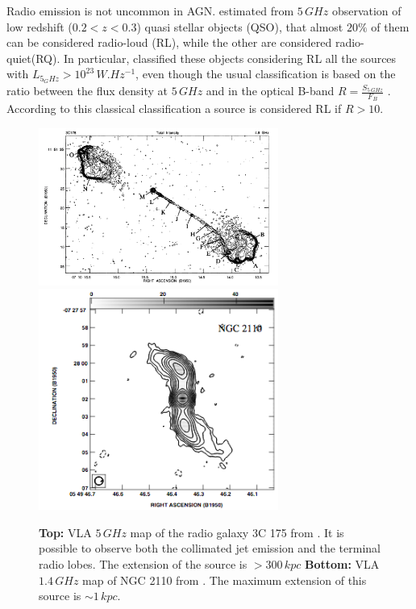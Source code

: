 \documentclass[../main.tex]{subfiles}
\begin{document}
Radio emission is not uncommon in AGN.
\citet{Kellermann16} estimated from $5\,\si{GHz}$ observation of low redshift ($0.2<z<0.3$) quasi stellar objects (QSO), that almost $20\%$ of them can be considered radio-loud (RL), while the other are considered radio-quiet(RQ).
In particular, \citet{Kellermann16} classified these objects considering RL all the sources with $L_{5_GHz}>10^{23}\,\si{W.Hz^{-1}}$, even though the usual classification is based on the ratio between the flux density at $5\,\si{GHz}$ and in the optical B-band $R=\frac{S_{5\,\si{GHz}}}{F_{B}}$ \citep{Kellermann89}.
According to this classical classification a source is considered RL if $R>10$.

\begin{figure}
\centering
\includegraphics[width=0.7\textwidth]{PhD_thesis/images/3c175.png} \\
\includegraphics[width=0.7\textwidth]{PhD_thesis/images/NGC2110.png}
\caption[]{\textbf{Top:} VLA $5\,\si{GHz}$ map of the radio galaxy 3C 175 from \citet{Bridle94}. It is possible to observe both the collimated jet emission and the terminal radio lobes. The extension of the source is $> 300\,\si{kpc}$ \textbf{Bottom:} VLA $1.4\,\si{GHz}$ map of NGC 2110 from \citet{Mundell09}. The maximum extension of this source is $\sim 1\,\si{kpc}$. }
\label{fig:radio_galaxies}
\end{figure}
\end{document}

